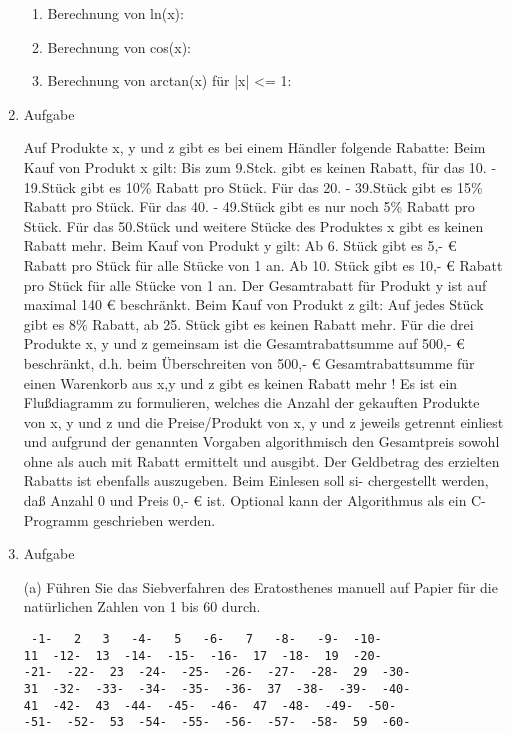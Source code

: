 \documentclass[12pt,a4paper]{scrreprt}
\begin{document}
\begin{enumerate}
\begin{enumerate}
\item Berechnung von ln(x):

\item Berechnung von cos(x):

\item Berechnung von arctan(x) für |x| <= 1:

\end{enumerate}

\item Aufgabe %

Auf Produkte x, y und z gibt es bei einem Händler folgende Rabatte:
Beim Kauf von Produkt x gilt:
Bis zum 9.Stck. gibt es keinen Rabatt, für das 10. - 19.Stück gibt es 10\% Rabatt pro Stück.
Für das 20. - 39.Stück gibt es 15\% Rabatt pro Stück.
Für das 40. - 49.Stück gibt es nur noch 5\% Rabatt pro Stück.
Für das 50.Stück und weitere Stücke des Produktes x gibt es keinen Rabatt mehr.
Beim Kauf von Produkt y gilt:
Ab 6. Stück gibt es 5,- € Rabatt pro Stück für alle Stücke von 1 an.
Ab 10. Stück gibt es 10,- € Rabatt pro Stück für alle Stücke von 1 an.
Der Gesamtrabatt für Produkt y ist auf maximal 140 € beschränkt.
Beim Kauf von Produkt z gilt:
Auf jedes Stück gibt es 8\% Rabatt, ab 25. Stück gibt es keinen Rabatt mehr.
Für die drei Produkte x, y und z gemeinsam ist die Gesamtrabattsumme auf 500,- €
beschränkt, d.h. beim Überschreiten von 500,- € Gesamtrabattsumme für einen Warenkorb
aus x,y und z gibt es keinen Rabatt mehr !
Es ist ein Flußdiagramm zu formulieren, welches die Anzahl der gekauften Produkte von
x, y und z und die Preise/Produkt von x, y und z jeweils getrennt einliest und aufgrund der
genannten Vorgaben algorithmisch den Gesamtpreis sowohl ohne als auch mit Rabatt ermittelt
und ausgibt. Der Geldbetrag des erzielten Rabatts ist ebenfalls auszugeben. Beim Einlesen soll si-
chergestellt werden, daß Anzahl 0 und Preis  0,- € ist.
Optional kann der Algorithmus als ein C-Programm geschrieben werden.

\item Aufgabe %

(a) Führen Sie das Siebverfahren des Eratosthenes manuell auf Papier für die natürlichen Zahlen von 1 bis 60 durch.

\begin{lstlisting}
 -1-   2   3   -4-   5   -6-   7   -8-   -9-  -10-
11  -12-  13  -14-  -15-  -16-  17  -18-  19  -20-
-21-  -22-  23  -24-  -25-  -26-  -27-  -28-  29  -30-
31  -32-  -33-  -34-  -35-  -36-  37  -38-  -39-  -40-
41  -42-  43  -44-  -45-  -46-  47  -48-  -49-  -50-
-51-  -52-  53  -54-  -55-  -56-  -57-  -58-  59  -60-
\end{lstlisting}


\end{enumerate}
\end{document}
